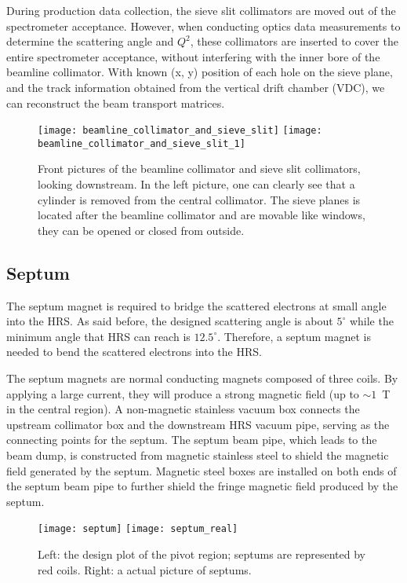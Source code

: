 During production data collection, the sieve slit collimators are moved out of the spectrometer
acceptance. However, when conducting optics data measurements to determine the 
scattering angle and $Q^2$, these collimators are inserted to cover the entire 
spectrometer acceptance, without interfering with the inner bore of the beamline collimator. 
With known (x, y) position of each hole on the sieve plane, and the track information obtained
from the vertical drift chamber (VDC), we can reconstruct the beam transport matrices.
\begin{figure}[!h]
    \centering
    \texttt{[image: beamline\_collimator\_and\_sieve\_slit]}
    \hspace{1cm}
    \texttt{[image: beamline\_collimator\_and\_sieve\_slit\_1]}
    \caption[sieve slit collimators]
    {Front pictures of the beamline collimator and sieve slit collimators, looking 
    downstream. In the left picture, one can clearly see that a cylinder is removed 
    from the central collimator.
    The sieve planes is located after the beamline collimator and are movable like
    windows, they can be opened or closed from outside.}
\end{figure}

\subsection{Septum}
The septum magnet is required to bridge the scattered electrons at small angle
into the HRS. As said before, the designed scattering angle is about $5^\circ$
while the minimum angle that HRS can reach is $12.5^\circ$. Therefore, a septum magnet 
is needed to bend the scattered electrons into the HRS. 

The septum magnets are normal conducting magnets composed of three coils.
By applying a large current, they will produce a strong magnetic field 
(up to $\sim 1$~T in the central region). A non-magnetic stainless vacuum box connects the upstream collimator box and the downstream HRS vacuum pipe, serving as the connecting points for the septum. The septum beam pipe, which leads to the beam dump, is constructed from magnetic stainless steel to shield the magnetic field generated by the septum. Magnetic steel boxes are installed on both ends of the septum beam pipe to further shield the fringe magnetic field produced by the septum.

\begin{figure}[!h]
    \texttt{[image: septum]}
    \texttt{[image: septum\_real]}
    \caption[pivot region]
    {Left: the design plot of the pivot region; septums are represented by
    red coils. Right: a actual picture of septums.
    }
\end{figure}

